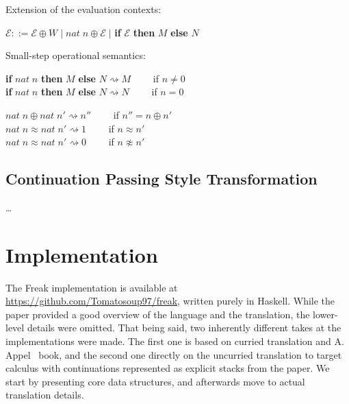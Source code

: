 \documentclass[declaration,shortabstract]{iithesis}
\theoremstyle{definition} \newtheorem{definition}{Definition}[chapter]
\theoremstyle{remark} \newtheorem{remark}[definition]{Observation}
\theoremstyle{plain} \newtheorem{theorem}[definition]{Theorem}
\theoremstyle{plain} \newtheorem{lemma}[definition]{Lemma}
\begin{document}
    \begin{flushleft}
    Extension of the evaluation contexts:
    \end{flushleft}

    \begin{flushleft}
    $\mathcal{E} ::= \mathcal{E} \oplus W \; | \; nat \; n \oplus \mathcal{E} \; |$ \textbf{if} $\mathcal{E}$ \textbf{then} $M$ \textbf{else} $N$
    \end{flushleft}

    \begin{flushleft}
    Small-step operational semantics:
    \end{flushleft}

    \begin{flushleft}
    \textbf{if} $nat \; n$ \textbf{then} $M$ \textbf{else} $N \rightsquigarrow M \quad \quad $ if $n \neq 0$ \\
    \textbf{if} $nat \; n$ \textbf{then} $M$ \textbf{else} $N \rightsquigarrow N \quad \quad $ if $n = 0$
    \end{flushleft}

    \begin{flushleft}
    $nat \; n \oplus nat \; n' \rightsquigarrow n'' \quad \quad $    if $ n'' = n \oplus n' $ \\
    $nat \; n \approx nat \; n' \rightsquigarrow 1  \quad \quad $    \; if $ n \approx n' $ \\
    $nat \; n \approx nat \; n' \rightsquigarrow 0  \quad \quad $    \; if $ n \not\approx n' $

    \end{flushleft}

\section{Continuation Passing Style Transformation}
    \ldots

\chapter{Implementation}\label{sec:implementation}

    The Freak implementation is available at \href{https://github.com/Tomatosoup97/freak}{\underline{https://github.com/Tomatosoup97/freak}},
    written purely in Haskell. While the paper provided a good overview of the
    language and the translation, the lower-level details were omitted. That
    being said, two inherently different takes at the implementations were made.
    The first one is based on curried translation and A. Appel~\cite{appel-continuations}
    book, and the second one directly on the uncurried translation to target
    calculus with continuations represented as explicit stacks from the paper.
    We start by presenting core data structures, and afterwards move to actual
    translation details.
\end{document}
